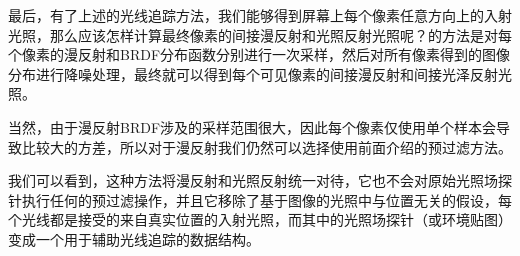 最后，有了上述的光线追踪方法，我们能够得到屏幕上每个像素任意方向上的入射光照，那么应该怎样计算最终像素的间接漫反射和光照反射光照呢？\cite{a:Real-TimeGlobalIlluminationusingPrecomputedLightFieldProbes}的方法是对每个像素的漫反射和BRDF分布函数分别进行一次采样，然后对所有像素得到的图像分布进行降噪处理，最终就可以得到每个可见像素的间接漫反射和间接光泽反射光照。

当然，由于漫反射BRDF涉及的采样范围很大，因此每个像素仅使用单个样本会导致比较大的方差，所以对于漫反射我们仍然可以选择使用前面介绍的预过滤方法。

我们可以看到，这种方法将漫反射和光照反射统一对待，它也不会对原始光照场探针执行任何的预过滤操作，并且它移除了基于图像的光照中与位置无关的假设，每个光线都是接受的来自真实位置的入射光照，而其中的光照场探针（或环境贴图）变成一个用于辅助光线追踪的数据结构。